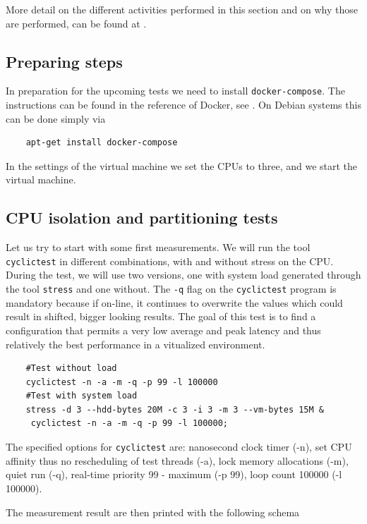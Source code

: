 \documentclass[]{scrartcl}
\begin{document}
More detail on the different activities performed in this section and on why those are performed, can be found at \cite{lrt01}.

\subsection{Preparing steps}

In preparation for the upcoming tests we need to install \texttt{docker-compose}.
The instructions can be found in the reference of Docker, see \cite{docker05}. 
On Debian systems this can be done simply via 

\begin{verbatim}
	apt-get install docker-compose
\end{verbatim}

In the settings of the virtual machine we set the CPUs to three, and we start the virtual machine.  

\subsection{CPU isolation and partitioning tests}

Let us try to start with some first measurements. We will run the tool \texttt{cyclictest} in different combinations, with and without stress on the CPU. 
During the test, we will use two versions, one with system load generated through the tool \texttt{stress} and one without. The \texttt{-q} flag on the \texttt{cyclictest} program is mandatory because if on-line, it continues to overwrite the values which could result in shifted, bigger looking results. 
The goal of this test is to find a configuration that permits a very low average and peak latency and thus relatively the best performance in a vitualized environment.

\begin{verbatim}
	#Test without load
	cyclictest -n -a -m -q -p 99 -l 100000
	#Test with system load
	stress -d 3 --hdd-bytes 20M -c 3 -i 3 -m 3 --vm-bytes 15M &
	 cyclictest -n -a -m -q -p 99 -l 100000;
\end{verbatim}

The specified options for \texttt{cyclictest} are: nanosecond clock timer (-n), set CPU affinity thus no rescheduling of test threads (-a), lock memory allocations (-m), quiet run (-q), real-time priority 99 - maximum (-p 99), loop count 100000 (-l 100000).

The measurement result are then printed with the following schema
\bigskip
\end{document}
